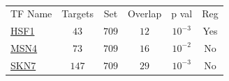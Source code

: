 \begin{table}[h!]
\centering 
{}
\begin{tabular}{l c c c c c}
\hline

TF Name &	Targets &	Set &	Overlap &	p val &	Reg \\ 
\href{www.yeastgenome.org/cgi-bin/locus.fpl?locus=HSF1}{HSF1} &	 $43$ &	$709$&	$12$ &	$10^{-3}$ & 	 Yes \\ 
\href{www.yeastgenome.org/cgi-bin/locus.fpl?locus=MSN4}{MSN4} &	 $73$ &	$709$&	$16$ &	$10^{-2}$ & 	 No \\ 
\href{www.yeastgenome.org/cgi-bin/locus.fpl?locus=SKN7}{SKN7} &	 $147$ &	$709$&	$29$ &	$10^{-3}$ & 	 No \\ 
\hline
\end{tabular} 
\caption[]{}
\label{}
\end{table} 


